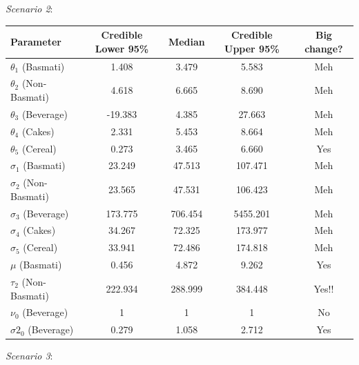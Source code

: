 \documentclass[]{article}
\begin{document}
\textit{Scenario 2}:

\begin{center}
  \begin{tabular}{l c c c c}
  \hline Parameter & Credible Lower 95\% & Median & Credible Upper 95\% & Big change? \\ \hline
    $\theta_1$ (Basmati) & 1.408 & 3.479 & 5.583 & Meh\\ 
    $\theta_2$ (Non-Basmati) & 4.618 & 6.665 & 8.690 & Meh\\
    $\theta_3$ (Beverage) & -19.383 & 4.385 & 27.663 & Meh\\
    $\theta_4$ (Cakes) & 2.331 & 5.453 & 8.664 & Meh \\
    $\theta_5$ (Cereal) & 0.273 & 3.465 & 6.660 & Yes\\ \hline
    $\sigma_1$ (Basmati) & 23.249 & 47.513 & 107.471 & Meh \\ 
    $\sigma_2$ (Non-Basmati) & 23.565 & 47.531 & 106.423 & Meh \\
    $\sigma_3$ (Beverage) &  173.775 & 706.454 & 5455.201 & Meh \\
    $\sigma_4$ (Cakes) & 34.267 & 72.325 & 173.977 & Meh \\
    $\sigma_5$ (Cereal) & 33.941 & 72.486 & 174.818 & Meh \\ \hline
    $\mu$ (Basmati) & 0.456 & 4.872 & 9.262 & Yes \\ 
    $\tau_2$ (Non-Basmati) & 222.934 & 288.999 & 384.448 & Yes!! \\
    $\nu_0$ (Beverage) & 1 & 1 & 1 & No\\
    $\sigma2_0$ (Beverage) & 0.279 & 1.058 & 2.712 & Yes\\ \hline
  \end{tabular}
\end{center}

\textit{Scenario 3}:
\end{document}
